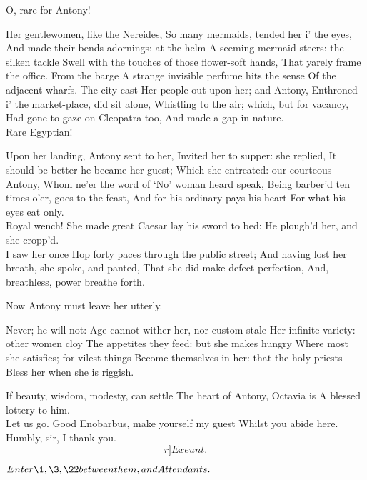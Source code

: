 \documentclass{book}
\begin{document}
\4	O, rare for Antony!

	Her gentlewomen, like the Nereides,
	So many mermaids, tended her i' the eyes,
	And made their bends adornings: at the helm
	A seeming mermaid steers: the silken tackle
	Swell with the touches of those flower-soft hands,
	That yarely frame the office. From the barge
	A strange invisible perfume hits the sense
	Of the adjacent wharfs. The city cast
	Her people out upon her; and Antony,
	Enthroned i' the market-place, did sit alone,
	Whistling to the air; which, but for vacancy,
	Had gone to gaze on Cleopatra too,
	And made a gap in nature.  \\

\4	Rare Egyptian!

	Upon her landing, Antony sent to her,
	Invited her to supper: she replied,
	It should be better he became her guest;
	Which she entreated: our courteous Antony,
	Whom ne'er the word of `No' woman heard speak,
	Being barber'd ten times o'er, goes to the feast,
	And for his ordinary pays his heart
	For what his eyes eat only.  \\

\4	Royal wench!
	She made great Caesar lay his sword to bed:
	He plough'd her, and she cropp'd. \\

	I saw her once
	Hop forty paces through the public street;
	And having lost her breath, she spoke, and panted,
	That she did make defect perfection,
	And, breathless, power breathe forth.

	Now Antony must leave her utterly.  

	Never; he will not:
	Age cannot wither her, nor custom stale
	Her infinite variety: other women cloy
	The appetites they feed: but she makes hungry
	Where most she satisfies; for vilest things
	Become themselves in her: that the holy priests
	Bless her when she is riggish.

	If beauty, wisdom, modesty, can settle
	The heart of Antony, Octavia is
	A blessed lottery to him. \\

\4	Let us go.
	Good Enobarbus, make yourself my guest
	Whilst you abide here.  \\[.]

	Humbly, sir, I thank you.
     \[r]Exeunt.\]




	\(Enter \1, \3, \22 between them,\\ and Attendants.\)
\end{document}
